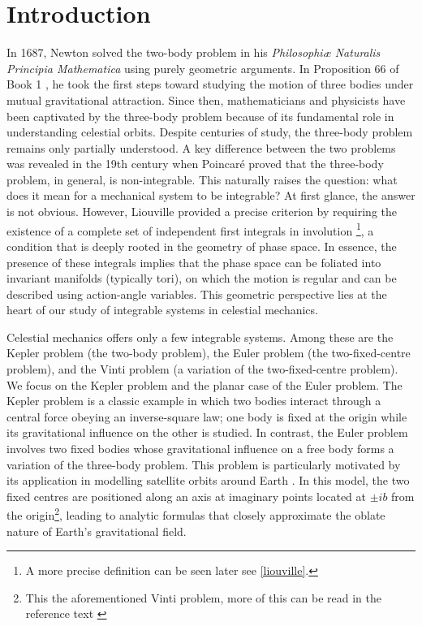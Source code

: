 \documentclass[12pt,oneside]{report}
\theoremstyle{definition}
\begin{document}
\tableofcontents
{}
\newpage
{}


\chapter{Introduction}
 In 1687, Newton solved the two-body problem in his \textit{Philosophi\ae{} Naturalis Principia Mathematica} using purely geometric arguments. In Proposition 66 of Book 1 \cite{linsky1996principia}, he took the first steps toward studying the motion of three bodies under mutual gravitational attraction. Since then, mathematicians and physicists have been captivated by the three-body problem because of its fundamental role in understanding celestial orbits. Despite centuries of study, the three-body problem remains only partially understood. A key difference between the two problems was revealed in the 19th century when Poincar\'e proved that the three-body problem, in general, is non-integrable. This naturally raises the question: what does it mean for a mechanical system to be integrable? At first glance, the answer is not obvious. However, Liouville provided a precise criterion by requiring the existence of a complete set of independent first integrals in involution \footnote{A more precise definition can be seen later see \ref{liouville}.}, a condition that is deeply rooted in the geometry of phase space. In essence, the presence of these integrals implies that the phase space can be foliated into invariant manifolds (typically tori), on which the motion is regular and can be described using action-angle variables. This geometric perspective lies at the heart of our study of integrable systems in celestial mechanics.

Celestial mechanics offers only a few integrable systems. Among these are the Kepler problem (the two-body problem), the Euler problem (the two-fixed-centre problem), and the Vinti problem (a variation of the two-fixed-centre problem). We focus on the Kepler problem and the planar case of the Euler problem. The Kepler problem is a classic example in which two bodies interact through a central force obeying an inverse-square law; one body is fixed at the origin while its gravitational influence on the other is studied. In contrast, the Euler problem involves two fixed bodies whose gravitational influence on a free body forms a variation of the three-body problem. This problem is particularly motivated by its application in modelling satellite orbits around Earth \cite{o2008integrable}. In this model, the two fixed centres are positioned along an axis at imaginary points located at \( \pm ib \) from the origin\footnote{This the aforementioned Vinti problem, more of this can be read in the reference text \cite{o2008integrable}}, leading to analytic formulas that closely approximate the oblate nature of Earth's gravitational field.
\end{document}
